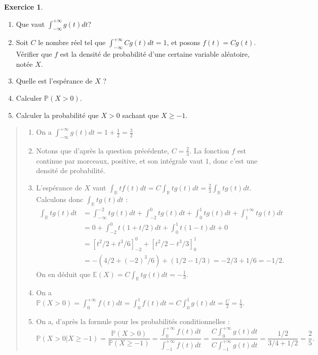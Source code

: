 \documentclass[10pt]{article}
\renewcommand{\P}{\mathbb P}
\newcommand{\R}{\mathbb R}
\newcommand{\E}{\mathbb E}
\theoremstyle{definition}
\newtheorem{exo}{Exercice}
\newenvironment{solution}{\begin{quote}\color{teal}}{\end{quote}}
\begin{document}
\begin{exo}
\begin{enumerate}
\item Que vaut $\int_{-\infty}^{+\infty} g(t)dt $?
\item Soit $C$ le nombre réel tel que $\int_{-\infty}^{+\infty} Cg(t)dt=1$, et posons $f(t)=Cg(t)$. Vérifier que $f$ est la densité de probabilité d'une certaine variable aléatoire, notée $X$.
\item Quelle est l'espérance de $X$ ?
\item Calculer $\P(X>0)$.
\item Calculer la probabilité que $X>0$ sachant que $X\geq -1$.
\end{enumerate}
\begin{solution}
\begin{enumerate}
\item On a $\int_{-\infty}^{+\infty} g(t)dt  = 1+\frac12=\frac{3}{2}$
\item Notons que d'après la question précédente, $C=\frac23$. La fonction $f$ est continue par morceaux, positive, et son intégrale vaut $1$, donc c'est une densité de probabilité.
\item L'espérance de $X$ vaut $\int_{\R}tf(t)dt=C\int_{\R}tg(t)dt = \frac23 \int_{\R}tg(t)dt$. Calculons donc $\int_{\R}tg(t)dt$ :
\begin{align*}
\int_{\R}tg(t)dt
&=\int_{-\infty}^{-2}tg(t)dt+\int_{-2}^0 tg(t)dt+\int_{0}^{1} tg(t)dt+\int_{1}^{+\infty} tg(t)dt\\
&=0+\int_{-2}^{0}t(1+t/2)dt+\int_0^1t(1-t)dt+0\\
&=\left[t^2/2+t^3/6\right]_{-2}^{0} + \left[t^2/2-t^3/3\right]_0^{1}\\
&=-(4/2+(-2)^3/6)+(1/2-1/3) = -2/3+1/6=-1/2.
\end{align*}
On en déduit que $\E(X)=C\int_{\R}tg(t)dt=\boxed{-\frac{1}{3}.}$
\item On a $\P(X>0)=\int_{0}^{+\infty} f(t)dt =\int_0^1 f(t)dt= C\int_0^1g(t)dt=\frac{C}{2}=\boxed{\frac{1}{3}.}$
\item On a, d'après la formule pour les probabilités conditionnelles :
\[\P(X>0|X\geq -1) = \frac{\P(X>0)}{\P(X\geq -1)}
=\frac{\int_{0}^{+\infty}f(t)dt}{\int_{-1}^{+\infty}f(t)dt}
=\frac{C\int_{0}^{+\infty}g(t)dt}{C\int_{-1}^{+\infty}g(t)dt}
=\frac{1/2}{3/4+1/2} =\boxed{\frac{2}{5}.}
\]
\end{enumerate}
\end{solution}
 \end{exo}
 
\end{document}
